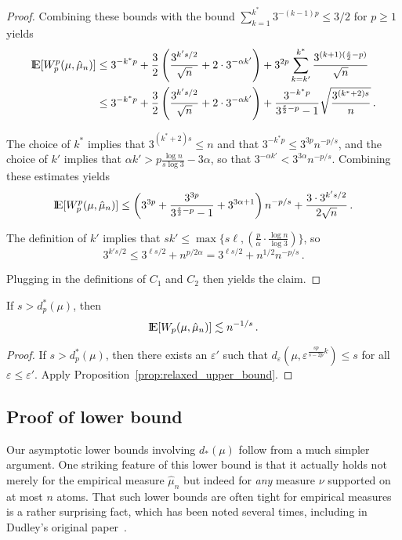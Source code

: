 \documentclass[sts]{imsart}
\newcommand*{\ep}{\varepsilon}
\begin{document}
\begin{proof}
Combining these bounds with the bound $\sum_{k=1}^{k^*} 3^{-(k-1)p} \leq 3/2$ for $p \geq 1$ yields
\begin{align*}
{\rm I}\kern-0.18em{\rm E}[W^p_p(\mu, \hat \mu_n)] & \leq 3^{-k^* p} + \frac 3 2\left(\frac{3^{k' s/2}}{\sqrt n} + 2 \cdot 3^{-\alpha k'}\right) + 3^{2p}\sum_{k = k'}^{k^*} \frac{3^{(k +1)(\frac s 2  -p)} }{\sqrt n} \\
& \leq 3^{-k^* p} + \frac 3 2 \left(\frac{3^{k' s/2}}{\sqrt n} + 2 \cdot 3^{-\alpha k'}\right) + \frac{3^{-k^* p}}{3^{\frac s 2 - p} - 1}\sqrt{\frac{3^{(k^*+2)s}}{n}}\,.
\end{align*}

The choice of $k^*$ implies that $3^{(k^* + 2)s} \leq n$ and that $3^{-k^* p} \leq 3^{3p} n^{-p/s}$, and the choice of $k'$ implies that $\alpha k' > p \frac{\log n}{s \log 3} - 3\alpha$, so that $3^{- \alpha k'} < 3^{3\alpha} n^{-p/s}$.
Combining these estimates yields
\begin{equation*}
{\rm I}\kern-0.18em{\rm E}[W^p_p(\mu, \hat \mu_n)] \leq \left(3^{3p}+\frac{3^{3p}}{3^{\frac s 2 - p} -1} + 3^{3\alpha + 1}\right) n^{-p/s} + \frac{3 \cdot 3^{k' s/2}}{2\sqrt n}\,.
\end{equation*}


The definition of $k'$ implies that $sk' \leq \max\{s\ell, (\frac{p}{\alpha} \cdot \frac{\log n}{\log 3})\}$, so
\begin{equation*}
3^{k' s/2} \leq 3^{\ell s/2} + n^{p/2\alpha} = 3^{\ell s/2} + n^{1/2}n^{-p/s}\,.
\end{equation*}

Plugging in the definitions of $C_1$ and $C_2$ then yields the claim.
\end{proof}


\begin{corollary}\label{cor:minkowski_upper_bound}
If $s > d_p^*(\mu)$, then
\begin{equation*}
{\rm I}\kern-0.18em{\rm E}[W_p(\mu, \hat \mu_n)] \lesssim n^{-1/s}\,.
\end{equation*}
\end{corollary}
\begin{proof}
If $s > d_p^*(\mu)$, then there exists an $\ep'$ such that $d_{\ep}(\mu, \ep^{\frac{sp}{s - 2p}k}) \leq s$ for all $\ep \leq \ep'$.
Apply Proposition~\ref{prop:relaxed_upper_bound}.
\end{proof}



\subsection{Proof of lower bound}
Our asymptotic lower bounds involving $d_*(\mu)$ follow from a much simpler argument.
One striking feature of this lower bound is that it actually holds not merely for the empirical measure $\hat \mu_n$ but indeed for \emph{any} measure $\nu$ supported on at most $n$ atoms.
That such lower bounds are often tight for empirical measures is a rather surprising fact, which has been noted several times, including in Dudley's original paper~\cite{GuiRos12,Klo12,DerSchSch13,Dud68,BoiLeg14}.
\end{document}
